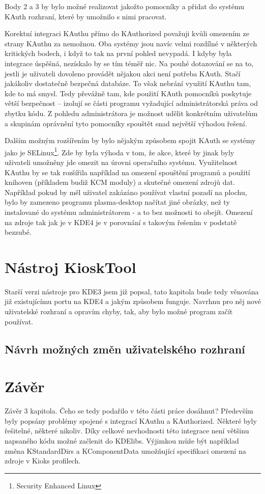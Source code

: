 Body 2 a 3 by bylo možné realizovat jakožto pomocníky a přidat do systému KAuth
rozhraní, které by umožnilo s nimi pracovat.

Korektní integraci KAuthu přímo do KAuthorized považuji kvůli omezením ze strany
KAuthu za nemožnou. Oba systémy jsou navíc velmi rozdílné v některých kritických
bodech, i když to tak na první pohled nevypadá. I kdyby byla integrace úspěšná,
nezískalo by se tím téměř nic. Na pouhé dotazování se na to, jestli je uživateli
dovoleno provádět nějakou akci není potřeba KAuth. Stačí jakákoliv dostatečně
bezpečná databáze. To však nebrání využití KAuthu tam, kde to má smysl. Tedy
převážně tam, kde použití KAuth pomocníků poskytuje větší bezpečnost -- izolují
se části programu vyžadující administrátorská práva od zbytku kódu. Z pohledu
administrátora je možnost udělit konkrétním uživatelům a skupinám oprávnění tyto
pomocníky spouštět snad největší výhodou řešení.

Dalším možným rozšířením by bylo nějakým způsobem spojit KAuth se systémy jako
je SELinux\footnote{Security Enhanced Linux}. Zde by byla výhoda v tom, že akce,
které by jinak byly uživateli umožněny jde omezit na úrovni operačního systému.
Využitelnost KAuthu by se tak rozšířila například na omezení spouštění programů
a použití knihoven (příkladem budiž KCM moduly) a skutečné omezení zdrojů dat.
Například pokud by měl uživatel zakázáno používat vlastní pozadí na plochu, bylo
by zamezeno programu plasma-desktop načítat jiné obrázky, než ty instalované do
systému administrátorem - a to bez možnosti to obejít. Omezení na zdroje tak jak
je v KDE4 je v porovnání s takovým řešením v podstatě bezzubé.

\chapter{Nástroj KioskTool}
Starší verzi nástroje pro KDE3 jsem již popsal, tato kapitola bude tedy věnována
již existujícímu portu na KDE4 a jakým způsobem funguje. Navrhnu pro něj nové
uživatelské rozhraní a opravím chyby, tak, aby bylo možné program začít
používat.
\section{Návrh možných změn uživatelského rozhraní}
\chapter{Závěr}

Závěr 3 kapitola.
Čeho se tedy podařilo v této části práce dosáhnut?
Především byly popsány problémy spojené s integrací KAuthu a KAuthorized.
Některé byly řešitelné, některé nikoliv. Díky celkové nevhodnosti této integrace
není většinu napsaného kódu možné začlenit do KDElibs. Výjimkou může být
například změna KStandardDirs a KComponentData umožňující specifikaci omezení
na zdroje v Kioks profilech.

\cite{fitWeb}
